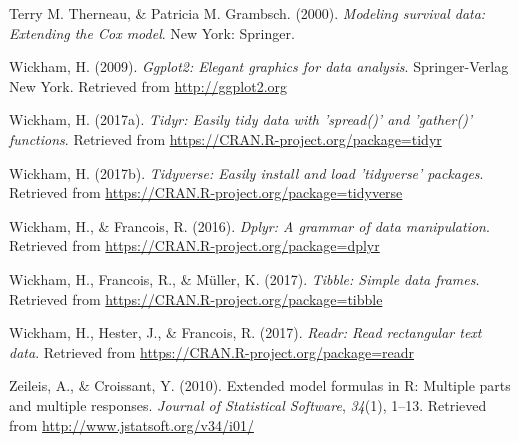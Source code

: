 \documentclass[english,man]{apa6}
\theoremstyle{definition}
\theoremstyle{definition}
\theoremstyle{remark}
\begin{document}
\hypertarget{ref-R-survival-book}{}
Terry M. Therneau, \& Patricia M. Grambsch. (2000). \emph{Modeling
survival data: Extending the Cox model}. New York: Springer.

\hypertarget{ref-R-ggplot2}{}
Wickham, H. (2009). \emph{Ggplot2: Elegant graphics for data analysis}.
Springer-Verlag New York. Retrieved from \url{http://ggplot2.org}

\hypertarget{ref-R-tidyr}{}
Wickham, H. (2017a). \emph{Tidyr: Easily tidy data with 'spread()' and
'gather()' functions}. Retrieved from
\url{https://CRAN.R-project.org/package=tidyr}

\hypertarget{ref-R-tidyverse}{}
Wickham, H. (2017b). \emph{Tidyverse: Easily install and load
'tidyverse' packages}. Retrieved from
\url{https://CRAN.R-project.org/package=tidyverse}

\hypertarget{ref-R-dplyr}{}
Wickham, H., \& Francois, R. (2016). \emph{Dplyr: A grammar of data
manipulation}. Retrieved from
\url{https://CRAN.R-project.org/package=dplyr}

\hypertarget{ref-R-tibble}{}
Wickham, H., Francois, R., \& Müller, K. (2017). \emph{Tibble: Simple
data frames}. Retrieved from
\url{https://CRAN.R-project.org/package=tibble}

\hypertarget{ref-R-readr}{}
Wickham, H., Hester, J., \& Francois, R. (2017). \emph{Readr: Read
rectangular text data}. Retrieved from
\url{https://CRAN.R-project.org/package=readr}

\hypertarget{ref-R-Formula}{}
Zeileis, A., \& Croissant, Y. (2010). Extended model formulas in R:
Multiple parts and multiple responses. \emph{Journal of Statistical
Software}, \emph{34}(1), 1--13. Retrieved from
\url{http://www.jstatsoft.org/v34/i01/}
\end{document}
